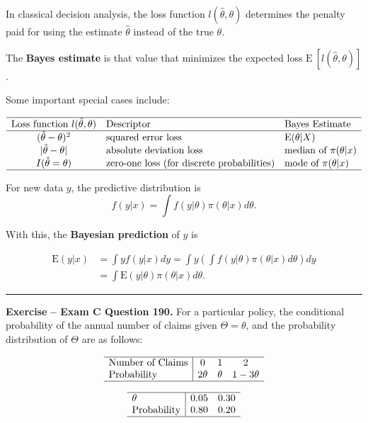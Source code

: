 \documentclass[]{book}
\theoremstyle{definition}
\theoremstyle{definition}
\theoremstyle{definition}
\theoremstyle{remark}
\begin{document}
In classical decision analysis, the loss function
\(l(\hat{\theta}, \theta)\) determines the penalty paid for using the
estimate \(\hat{\theta}\) instead of the true \(\theta\).

The \textbf{Bayes estimate} is that value that minimizes the expected
loss \(\mathrm{E~}[ l(\hat{\theta}, \theta)]\).

Some important special cases include:

\[\begin{array}{cll}
\hline
\text{Loss function } l(\hat{\theta}, \theta) & \text{Descriptor} & \text{Bayes Estimate} \\
\hline 
(\hat{\theta}- \theta)^2 & \text{squared error loss} & \mathrm{E}(\theta|X) \\
|\hat{\theta}- \theta| & \text{absolute deviation loss} & \text{median of } \pi(\theta|x) \\
I(\hat{\theta} =\theta) & \text{zero-one loss (for discrete probabilities)} & \text{mode of } \pi(\theta|x) \\
\hline
\end{array}\]

For new data \(y\), the predictive distribution is
\[f(y|x) = \int f(y|\theta) \pi(\theta|x) d\theta .\]

With this, the \textbf{Bayesian prediction} of \(y\) is

\[\begin{aligned}
\mathrm{E}(y|x) &=  \int y f(y|x) dy = \int y \left(\int f(y|\theta) \pi(\theta|x) d\theta \right) dy \\
&=  \int  \mathrm{E}(y|\theta) \pi(\theta|x) d\theta .
\end{aligned}\]

\begin{center}\rule{0.5\linewidth}{\linethickness}\end{center}

\textbf{Exercise -- Exam C Question 190.} For a particular policy, the
conditional probability of the annual number of claims given
\(\Theta = \theta\), and the probability distribution of \(\Theta\) are
as follows:

\[\begin{array}{l|ccc}
\hline
\text{Number of Claims} & 0 & 1 & 2 \\
\text{Probability} & 2\theta & \theta & 1-3\theta \\
\hline
\end{array}\]

\[\begin{array}{l|cc}
\hline
\theta & 0.05 & 0.30 \\
\text{Probability} & 0.80 & 0.20 \\
\hline
\end{array}\]
\end{document}
